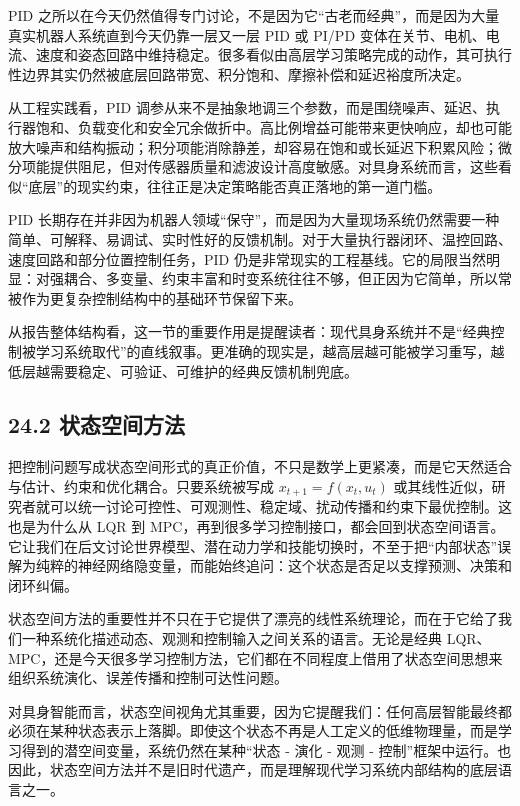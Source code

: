 PID 之所以在今天仍然值得专门讨论，不是因为它“古老而经典”，而是因为大量真实机器人系统直到今天仍靠一层又一层 PID 或 PI/PD 变体在关节、电机、电流、速度和姿态回路中维持稳定。很多看似由高层学习策略完成的动作，其可执行性边界其实仍然被底层回路带宽、积分饱和、摩擦补偿和延迟裕度所决定。

从工程实践看，PID 调参从来不是抽象地调三个参数，而是围绕噪声、延迟、执行器饱和、负载变化和安全冗余做折中。高比例增益可能带来更快响应，却也可能放大噪声和结构振动；积分项能消除静差，却容易在饱和或长延迟下积累风险；微分项能提供阻尼，但对传感器质量和滤波设计高度敏感。对具身系统而言，这些看似“底层”的现实约束，往往正是决定策略能否真正落地的第一道门槛。

PID 长期存在并非因为机器人领域“保守”，而是因为大量现场系统仍然需要一种简单、可解释、易调试、实时性好的反馈机制。对于大量执行器闭环、温控回路、速度回路和部分位置控制任务，PID 仍是非常现实的工程基线。它的局限当然明显：对强耦合、多变量、约束丰富和时变系统往往不够，但正因为它简单，所以常被作为更复杂控制结构中的基础环节保留下来。

从报告整体结构看，这一节的重要作用是提醒读者：现代具身系统并不是“经典控制被学习系统取代”的直线叙事。更准确的现实是，越高层越可能被学习重写，越低层越需要稳定、可验证、可维护的经典反馈机制兜底。

\subsection*{24.2 状态空间方法}


把控制问题写成状态空间形式的真正价值，不只是数学上更紧凑，而是它天然适合与估计、约束和优化耦合。只要系统被写成 \(x_{t+1}=f(x_t,u_t)\) 或其线性近似，研究者就可以统一讨论可控性、可观测性、稳定域、扰动传播和约束下最优控制。这也是为什么从 LQR 到 MPC，再到很多学习控制接口，都会回到状态空间语言。它让我们在后文讨论世界模型、潜在动力学和技能切换时，不至于把“内部状态”误解为纯粹的神经网络隐变量，而能始终追问：这个状态是否足以支撑预测、决策和闭环纠偏。

状态空间方法的重要性并不只在于它提供了漂亮的线性系统理论，而在于它给了我们一种系统化描述动态、观测和控制输入之间关系的语言。无论是经典 LQR、MPC，还是今天很多学习控制方法，它们都在不同程度上借用了状态空间思想来组织系统演化、误差传播和控制可达性问题。

对具身智能而言，状态空间视角尤其重要，因为它提醒我们：任何高层智能最终都必须在某种状态表示上落脚。即使这个状态不再是人工定义的低维物理量，而是学习得到的潜空间变量，系统仍然在某种“状态 - 演化 - 观测 - 控制”框架中运行。也因此，状态空间方法并不是旧时代遗产，而是理解现代学习系统内部结构的底层语言之一。

